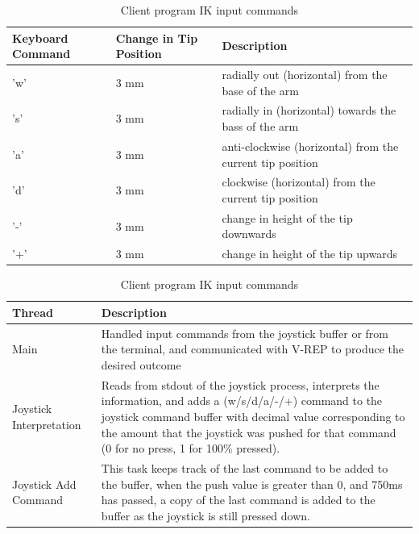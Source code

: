 \documentclass[12pt,openany,a4paper]{book}
\begin{document}
\begin{center}
\begin{table}[htb]

    \begin{tabular}{| l | l | p{6cm} |}
     \hline
     Keyboard Command & Change in Tip Position & Description  \\ 
     \hline
     'w' & 3 mm & radially out (horizontal) from the base of the arm \\ 
     \hline
     's' & 3 mm & radially in (horizontal) towards the bass of the arm \\ 
     \hline
     'a' & 3 mm & anti-clockwise (horizontal) from the current tip position \\ 				 \hline
     'd' & 3 mm & clockwise (horizontal) from the current tip position \\ 
     \hline
     '-' & 3 mm & change in height of the tip downwards \\ 
     \hline
     '+' & 3 mm & change in height of the tip upwards \\ 
     \hline
    \end{tabular}
    \caption{Client program IK input commands}
\end{table}
\end{center}

\begin{center}
\begin{table}[htb]
    
    \begin{tabular}{| l | p{10cm} |}
    \hline
     Thread & Description     \\
     \hline
     Main & Handled input commands from the joystick buffer or from the terminal, and communicated with V-REP to produce the desired outcome  \\
     \hline 
     Joystick Interpretation & Reads from stdout of the joystick process, interprets the information, and adds a (w/s/d/a/-/+) command to the joystick command buffer with decimal value corresponding to the amount that the joystick was pushed for that command (0 for no press, 1 for 100\% pressed).\\
     \hline
     Joystick Add Command & This task keeps track of the last command to be added to the buffer, when the push value is greater than 0, and 750ms has passed, a copy of the last command is added to the buffer as the joystick is still pressed down. \\ \hline
    \end{tabular}
    \caption{Client program IK input commands}
\end{table}
\end{center}
\end{document}
